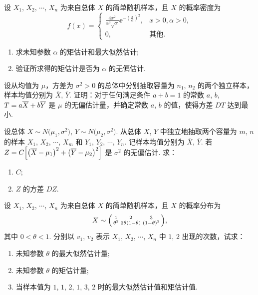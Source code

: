 	\begin{titwo}
		设 $X_{1}$, $X_{2}$, $\cdots$, $X_{n}$ 为来自总体 $X$ 的简单随机样本，且 $X$ 的概率密度为
		\[
			f(x) = \begin{cases}
				\frac{4x^{2}}{\alpha^{3} \sqrt{\uppi}} \ee^{ - (\frac{x}{\alpha})^{2} }, & x > 0, \alpha > 0, \\
				0, & \text{其他}.
			\end{cases}
		\]
		\begin{enumerate}
			\item 求未知参数 $\alpha$ 的矩估计和最大似然估计;
			\item 验证所求得的矩估计是否为 $\alpha$ 的无偏估计.
		\end{enumerate}
	\end{titwo}

	\begin{titwo}
		设从均值为 $\mu$，方差为 $\sigma^{2} > 0$ 的总体中分别抽取容量为 $n_{1}$, $n_{2}$ 的两个独立样本，样本均值分别为 $\overline{X}$, $\overline{Y}$. 证明：对于任何满足条件 $a + b = 1$ 的常数 $a$, $b$, $T = a \* \overline{X} + b \* \overline{Y}$ 是 $\mu$ 的无偏估计量，并确定常数 $a$, $b$ 的值，使得方差 $DT$ 达到最小.
	\end{titwo}

	\begin{titwo}
		设总体 $X \sim N \bigl( \mu_{1},\sigma^{2} \bigr)$, $Y \sim N\bigl( \mu_{2},\sigma^{2} \bigr)$. 从总体 $X$, $Y$ 中独立地抽取两个容量为 $m$, $n$ 的样本 $X_{1}$, $X_{2}$, $\cdots$, $X_{m}$ 和 $Y_{1}$, $Y_{2}$, $\cdots$, $Y_{n}$. 记样本均值分别为 $\overline{X}$, $\overline{Y}$. 若 $Z = C \Bigl[ \bigl( \overline{X} - \mu_{1} \bigr)^{2} + \bigl( \overline{Y} - \mu_{2} \bigr)^{2} \Bigr]$ 是 $\sigma^{2}$ 的无偏估计. 求：
		\begin{enumerate}
			\item $C$;
			\item $Z$ 的方差 $DZ$.
		\end{enumerate}
	\end{titwo}

	\begin{titwo}
		设 $X_{1}$, $X_{2}$, $\cdots$, $X_{n}$ 为来自总体 $X$ 的简单随机样本，且 $X$ 的概率分布为
		\[
			X \sim \begin{psmallmatrix}
				1 & 2 & 3 \\
				\theta^{2} & 2 \theta (1 - \theta) & (1 - \theta)^{2}
			\end{psmallmatrix},
		\]
		其中 $0 < \theta < 1$. 分别以 $v_{1}$, $v_{2}$ 表示 $X_{1}$, $X_{2}$, $\cdots$, $X_{n}$ 中 $1$, $2$ 出现的次数，试求：
		\begin{enumerate}
			\item 未知参数 $\theta$ 的最大似然估计量;
			\item 未知参数 $\theta$ 的矩估计量;
			\item 当样本值为 $1$, $1$, $2$, $1$, $3$, $2$ 时的最大似然估计值和矩估计值.
		\end{enumerate}
	\end{titwo}

